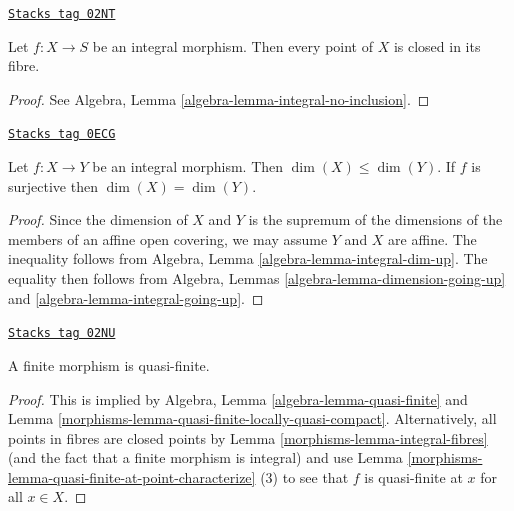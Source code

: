 \begin{lemma}
\label{morphisms-lemma-integral-fibres}
\href{https://stacks.math.columbia.edu/tag/02NT}{\texttt{Stacks tag 02NT}}

Let $f : X \to S$ be an integral morphism.
Then every point of $X$ is closed in its fibre.
\end{lemma}

\begin{proof}
See Algebra, Lemma \ref{algebra-lemma-integral-no-inclusion}.
\end{proof}

\begin{lemma}
\label{morphisms-lemma-integral-dimension}
\href{https://stacks.math.columbia.edu/tag/0ECG}{\texttt{Stacks tag 0ECG}}

Let $f : X \to Y$ be an integral morphism. Then $\dim(X) \leq \dim(Y)$.
If $f$ is surjective then $\dim(X) = \dim(Y)$.
\end{lemma}

\begin{proof}
Since the dimension of $X$ and $Y$ is the supremum of the dimensions
of the members of an affine open covering, we may assume $Y$ and $X$
are affine. The inequality follows from
Algebra, Lemma \ref{algebra-lemma-integral-dim-up}.
The equality then follows from
Algebra, Lemmas \ref{algebra-lemma-dimension-going-up}
and \ref{algebra-lemma-integral-going-up}.
\end{proof}

\begin{lemma}
\label{morphisms-lemma-finite-quasi-finite}
\href{https://stacks.math.columbia.edu/tag/02NU}{\texttt{Stacks tag 02NU}}

A finite morphism is quasi-finite.
\end{lemma}

\begin{proof}

This is implied by Algebra, Lemma \ref{algebra-lemma-quasi-finite}
and Lemma \ref{morphisms-lemma-quasi-finite-locally-quasi-compact}.
Alternatively, all points in fibres are closed points by
Lemma \ref{morphisms-lemma-integral-fibres} (and the fact that a finite
morphism is integral) and use
Lemma \ref{morphisms-lemma-quasi-finite-at-point-characterize} (3) to
see that $f$ is quasi-finite at $x$ for all $x \in X$.
\end{proof}

